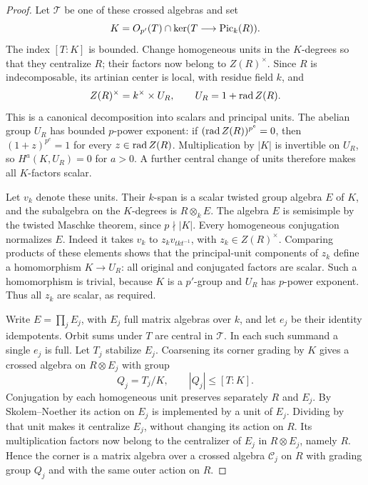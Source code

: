 \begin{proof}
Let $\mathcal T$ be one of these crossed algebras and set
\[
 K=O_{p'}(T)\cap\ker(T\longrightarrow\operatorname{Pic}_k(R)).
\]
The index $[T:K]$ is bounded.  Change homogeneous units in the
$K$-degrees so that they centralize $R$; their factors now belong
to $Z(R)^\times$.  Since $R$ is indecomposable, its artinian center
is local, with residue field $k$, and
\begin{equation}\label{eq:ext:center-units}
 Z(R)^\times=k^\times\times U_R,
 \qquad U_R=1+\operatorname{rad} Z(R).
\end{equation}
This is a canonical decomposition into scalars and principal
units.  The abelian group $U_R$ has bounded $p$-power exponent:
if $(\operatorname{rad} Z(R))^{p^e}=0$, then $(1+z)^{p^e}=1$ for every
$z\in\operatorname{rad} Z(R)$.  Multiplication by $|K|$ is invertible on $U_R$,
so $H^a(K,U_R)=0$ for $a>0$.  A further central change of units
therefore makes all $K$-factors scalar.

Let $v_k$ denote these units.  Their $k$-span is a scalar twisted
group algebra $E$ of $K$, and the subalgebra on the $K$-degrees is
$R\otimes_k E$.  The algebra $E$ is semisimple by the twisted
Maschke theorem, since $p\nmid|K|$.  Every homogeneous conjugation
normalizes $E$.  Indeed it takes $v_k$ to
$z_kv_{tkt^{-1}}$, with $z_k\in Z(R)^\times$.  Comparing products
of these elements shows that the principal-unit components of
$z_k$ define a homomorphism $K\to U_R$: all original and
conjugated factors are scalar.  Such a homomorphism is trivial,
because $K$ is a $p'$-group and $U_R$ has $p$-power exponent.
Thus all $z_k$ are scalar, as required.

Write $E=\prod_j E_j$, with $E_j$ full matrix algebras over $k$,
and let $e_j$ be their identity idempotents.  Orbit sums under $T$
are central in $\mathcal T$.  In each such summand a single $e_j$
is full.  Let $T_j$ stabilize $E_j$.  Coarsening its corner grading
by $K$ gives a crossed algebra on $R\otimes E_j$ with group
\[
 Q_j=T_j/K,\qquad |Q_j|\leq[T:K].
\]
Conjugation by each homogeneous unit preserves separately $R$
and $E_j$.  By Skolem--Noether its action on $E_j$ is implemented
by a unit of $E_j$.  Dividing by that unit makes it centralize
$E_j$, without changing its action on $R$.  Its multiplication
factors now belong to the centralizer of $E_j$ in $R\otimes E_j$,
namely $R$.  Hence the corner is a matrix algebra over a crossed
algebra $\mathcal C_j$ on $R$ with grading group $Q_j$ and with
the same outer action on $R$.


\end{proof}
